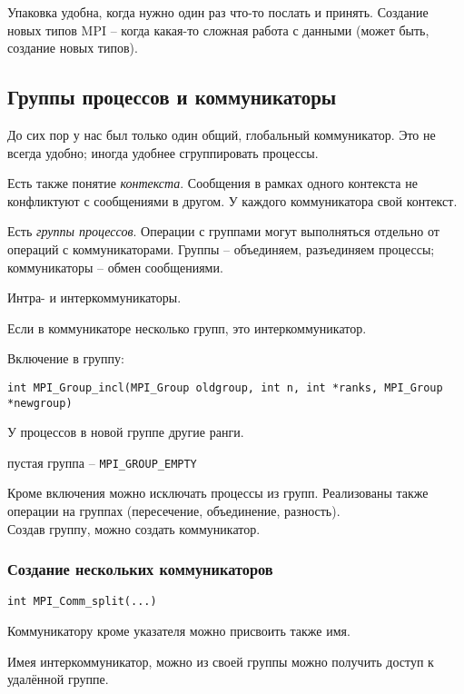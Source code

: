 \documentclass[main.tex]{subfiles}
\begin{document}
Упаковка удобна, когда нужно один раз что-то послать и принять.
Создание новых типов MPI -- когда какая-то сложная работа с данными (может быть, создание новых типов).

\subsection{Группы процессов и коммуникаторы}

До сих пор у нас был только один общий, глобальный коммуникатор.
Это не всегда удобно; иногда удобнее сгруппировать процессы.

Есть также понятие \emph{контекста}.
Сообщения в рамках одного контекста не конфликтуют с сообщениями в другом.
У каждого коммуникатора свой контекст.

Есть \emph{группы процессов}.
Операции с группами могут выполняться отдельно от операций с коммуникаторами.
Группы -- объединяем, разъединяем процессы; коммуникаторы -- обмен сообщениями.


Интра- и интеркоммуникаторы.


Если в коммуникаторе несколько групп, это интеркоммуникатор.

Включение в группу:

\begin{verbatim}
int MPI_Group_incl(MPI_Group oldgroup, int n, int *ranks, MPI_Group *newgroup)
\end{verbatim}

У процессов в новой группе другие ранги.

пустая группа -- \texttt{MPI\_GROUP\_EMPTY}

Кроме включения можно исключать процессы из групп.
Реализованы также операции на группах (пересечение, объединение, разность).  \\

Создав группу, можно создать коммуникатор.

\subsubsection{Создание нескольких коммуникаторов}

\begin{verbatim}
int MPI_Comm_split(...)
\end{verbatim}

Коммуникатору кроме указателя можно присвоить также имя.

Имея интеркоммуникатор, можно из своей группы можно получить доступ к удалённой группе.
\end{document}

